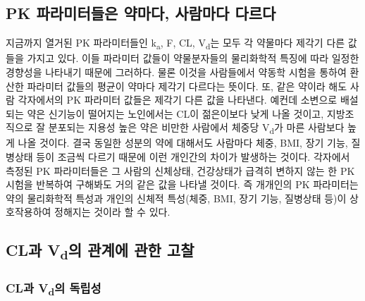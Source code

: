 \documentclass[
  11pt,
  krantz2, a4paper, twoside]{krantz}
\theoremstyle{definition}
\theoremstyle{definition}
\theoremstyle{definition}
\theoremstyle{definition}
\theoremstyle{remark}
\begin{document}
\hypertarget{pk-uxd30cuxb77cuxbbf8uxd130uxb4e4uxc740-uxc57duxb9c8uxb2e4-uxc0acuxb78cuxb9c8uxb2e4-uxb2e4uxb974uxb2e4}{%
\subsection{PK 파라미터들은 약마다, 사람마다 다르다}\label{pk-uxd30cuxb77cuxbbf8uxd130uxb4e4uxc740-uxc57duxb9c8uxb2e4-uxc0acuxb78cuxb9c8uxb2e4-uxb2e4uxb974uxb2e4}}

지금까지 열거된 PK 파라미터들인 k\textsubscript{a}, F, CL, V\textsubscript{d}는 모두 각 약물마다
제각기 다른 값들을 가지고 있다. 이들 파라미터 값들이 약물분자들의
물리화학적 특징에 따라 일정한 경향성을 나타내기 때문에 그러하다. 물론
이것을 사람들에서 약동학 시험을 통하여 환산한 파라미터 값들의 평균이
약마다 제각기 다르다는 뜻이다. 또, 같은 약이라 해도 사람 각자에서의 PK
파라미터 값들은 제각기 다른 값을 나타낸다. 예컨데 소변으로 배설되는 약은
신기능이 떨어지는 노인에서는 CL이 젊은이보다 낮게 나올 것이고,
지방조직으로 잘 분포되는 지용성 높은 약은 비만한 사람에서 체중당 V\textsubscript{d}가
마른 사람보다 높게 나올 것이다. 결국 동일한 성분의 약에 대해서도
사람마다 체중, BMI, 장기 기능, 질병상태 등이 조금씩 다르기 때문에 이런
개인간의 차이가 발생하는 것이다. 각자에서 측정된 PK 파라미터들은 그
사람의 신체상태, 건강상태가 급격히 변하지 않는 한 PK 시험을 반복하여
구해봐도 거의 같은 값을 나타낼 것이다. 즉 개개인의 PK 파라미터는 약의
물리화학적 특성과 개인의 신체적 특성(체중, BMI, 장기 기능, 질병상태
등)이 상호작용하여 정해지는 것이라 할 수 있다.

\hypertarget{cluxacfc-vduxc758-uxad00uxacc4uxc5d0-uxad00uxd55c-uxace0uxcc30}{%
\subsection{\texorpdfstring{CL과 V\textsubscript{d}의 관계에 관한 고찰}{CL과 Vd의 관계에 관한 고찰}}\label{cluxacfc-vduxc758-uxad00uxacc4uxc5d0-uxad00uxd55c-uxace0uxcc30}}

\hypertarget{cluxacfc-vduxc758-uxb3c5uxb9bduxc131}{%
\subsubsection{\texorpdfstring{CL과 V\textsubscript{d}의 독립성}{CL과 Vd의 독립성}}\label{cluxacfc-vduxc758-uxb3c5uxb9bduxc131}}
\end{document}
